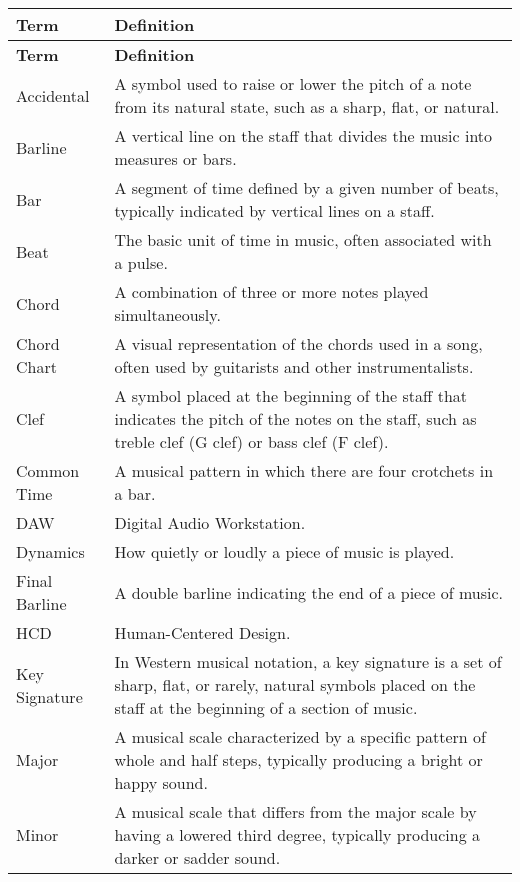 \documentclass[12pt]{article}
\begin{document}
\begin{longtable}{|l|p{12cm}|}
\hline
\textbf{Term} & \textbf{Definition} \\ 
\hline
\endfirsthead

\hline
\textbf{Term} & \textbf{Definition} \\ 
\hline
\endhead

\hline
\endfoot

\hline
\endlastfoot

Accidental & A symbol used to raise or lower the pitch of a note from its natural state, such as a sharp, flat, or natural. \\ 
\hline
Barline & A vertical line on the staff that divides the music into measures or bars. \\ 
\hline
Bar & A segment of time defined by a given number of beats, typically indicated by vertical lines on a staff. \\ 
\hline
Beat & The basic unit of time in music, often associated with a pulse. \\ 
\hline
Chord & A combination of three or more notes played simultaneously. \\ 
\hline
Chord Chart & A visual representation of the chords used in a song, often used by guitarists and other instrumentalists. \\ 
\hline
Clef & A symbol placed at the beginning of the staff that indicates the pitch of the notes on the staff, such as treble clef (G clef) or bass clef (F clef). \\ 
\hline
Common Time & A musical pattern in which there are four crotchets in a bar. \\ 
\hline
DAW & Digital Audio Workstation. \\ 
\hline
Dynamics & How quietly or loudly a piece of music is played. \\ 
\hline
Final Barline & A double barline indicating the end of a piece of music. \\ 
\hline
HCD & Human-Centered Design. \\ 
\hline
Key Signature & In Western musical notation, a key signature is a set of sharp, flat, or rarely, natural symbols placed on the staff at the beginning of a section of music. \\ 
\hline
Major & A musical scale characterized by a specific pattern of whole and half steps, typically producing a bright or happy sound. \\ 
\hline
Minor & A musical scale that differs from the major scale by having a lowered third degree, typically producing a darker or sadder sound. \\ 

\end{longtable}
\end{document}
